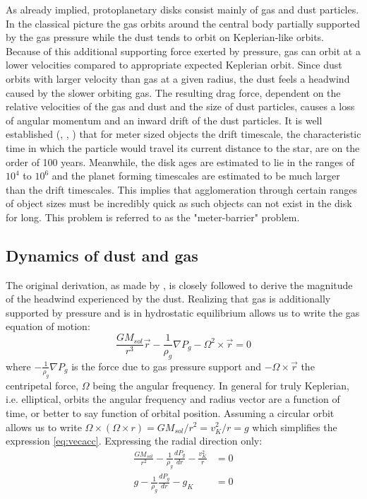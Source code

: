\documentclass[12pt]{article}
\begin{document}
As already implied, protoplanetary disks consist mainly of gas and dust particles. In the classical picture the gas orbits around the central body partially supported by the gas pressure while the dust tends to orbit on Keplerian-like orbits. Because of this additional supporting force exerted by pressure, gas can orbit at a lower velocities compared to appropriate expected Keplerian orbit. Since dust orbits with larger velocity than gas at a given radius, the dust feels a headwind caused by the slower orbiting gas. The resulting drag force, dependent on the relative velocities of the gas and dust and the size of dust particles, causes a loss of angular momentum and an inward drift of the dust particles. It is well established (\cite{Weidenschilling77}, \cite{Armitage07}, \cite{ChiangYoudin10}) that for meter sized objects the drift timescale, the characteristic time in which the particle would travel its current distance to the star, are on the order of 100 years. Meanwhile, the disk ages are estimated to lie in the ranges of $10^4$ to $10^6$ \citep{Weidenschilling77} and the planet forming timescales are estimated to be much larger than the drift timescales. This implies that agglomeration through certain ranges of object sizes must be incredibly quick as such objects can not exist in the disk for long. This problem is referred to as the "meter-barrier" problem. 

\subsection{Dynamics of dust and gas}
\label{subsec:dynamics}

The original derivation, as made by \citet{Weidenschilling77}, is closely followed to derive the magnitude of the headwind experienced by the dust. Realizing that gas is additionally supported by pressure and is in hydrostatic equilibrium allows us to write the gas equation of motion:
\begin{equation}
    \label{eq:vecacc}
    \frac{GM_{sol}}{r^3}\vec{r} - \frac{1}{\rho_g}\nabla P_g - \Omega^2\times\vec{r} = 0
\end{equation}
where $-\frac{1}{\rho_g}\nabla P_g$ is the force due to gas pressure support and  $-\Omega\times\vec{r}$ the centripetal force, $\Omega$ being the angular frequency. In general for truly Keplerian, i.e. elliptical, orbits the angular frequency and radius vector are a function of time, or better to say function of orbital position. Assuming a circular orbit allows us to write $\Omega\times(\Omega\times r) = GM_{sol}/r^2 = v_K^2/r = g$ which simplifies the expression \ref{eq:vecacc}. Expressing the radial direction only:
\begin{align}
    \label{eq:radialacc}
    \frac{GM_{sol}}{r^2} - \frac{1}{\rho_g}\frac{dP_g}{dr} - \frac{v_K^2}{r} &= 0 \\
    g - \frac{1}{\rho_g}\frac{dP_g}{dr} - g_K &= 0
\end{align}
\end{document}
